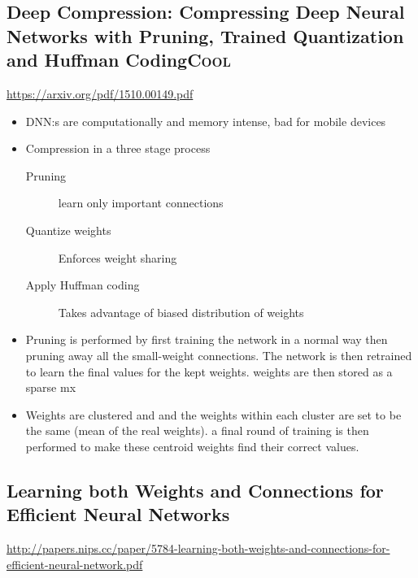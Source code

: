 \documentclass[11pt]{article}
\begin{document}
\subsection{Deep Compression: Compressing Deep Neural Networks with Pruning, Trained Quantization and Huffman Coding\hfill{}\textsc{Cool}}
\label{sec:org810dd3a}
\url{https://arxiv.org/pdf/1510.00149.pdf}

\begin{itemize}
\item DNN:s are computationally and memory intense, bad for mobile devices
\item Compression in a three stage process
\begin{description}
\item[{Pruning}] learn only important connections
\item[{Quantize weights}] Enforces weight sharing
\item[{Apply Huffman coding}] Takes advantage of biased distribution of weights
\end{description}
\item Pruning is performed by first training the network in a normal way then pruning away all the small-weight connections. The network is then retrained to learn the final values for the kept weights. weights are then stored as a sparse mx
\item Weights are clustered and and the weights within each cluster are set to be the same (mean of the real weights). a final round of training is then performed to make these centroid weights find their correct values.
\end{itemize}

\subsection{Learning both Weights and Connections for Efficient Neural Networks}
\label{sec:org21d3f5d}
\url{http://papers.nips.cc/paper/5784-learning-both-weights-and-connections-for-efficient-neural-network.pdf}
\end{document}
